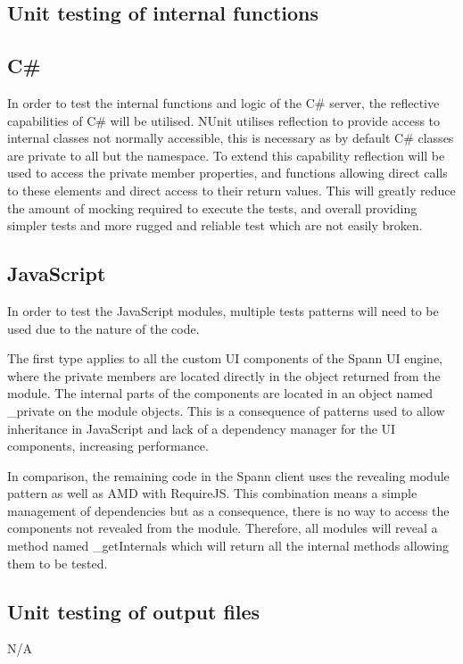 \documentclass[12pt, titlepage]{article}
\begin{document}
\subsection{Unit testing of internal functions}

\subsection{C\#}
In order to test the internal functions and logic of the C\# server, the
reflective capabilities of C\# will be utilised. NUnit utilises reflection to
provide access to internal classes not normally accessible, this is necessary
as by default C\# classes are private to all but the namespace. To extend this
capability reflection will be used to access the private member properties, and
functions allowing direct calls to these elements and direct access to their
return values. This will greatly reduce the amount of mocking required to
execute the tests, and overall providing simpler tests and more rugged and
reliable test which are not easily broken. 

\subsection{JavaScript} In order to test the JavaScript modules, multiple tests
patterns will need to be used due to the nature of the code. 

The first type applies to all the custom UI components of the Spann UI engine,
where the private members are located directly in the object returned from the
module. The internal parts of the components are located in an object named
\_private on the module objects. This is a consequence of patterns used to allow
inheritance in JavaScript and lack of a dependency manager for the UI
components, increasing performance.  

In comparison, the remaining code in the Spann client uses the revealing module
pattern as well as AMD with RequireJS. This combination means a simple
management of dependencies but as a consequence, there is no way to access the
components not revealed from the module. Therefore, all modules will reveal a
method named \_getInternals which will return all the internal methods allowing
them to be tested. 

		
\subsection{Unit testing of output files}		
N/A





\end{document}
